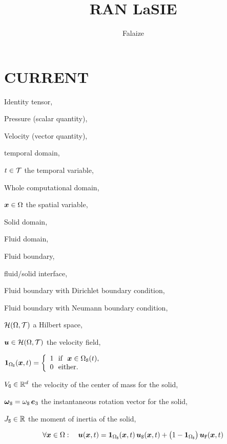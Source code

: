 \documentclass[10pt,a4paper]{article}
\author{Falaize}
\title{RAN LaSIE}
\begin{document}
%
%
\part{CURRENT}
\begin{description}
\item[$\Id$] Identity tensor,
%
\item[$p$] Pressure (scalar quantity),
%
\item[$\vu$] Velocity (vector quantity),
%
\item[$\sT\subset \RR$] temporal domain,
%
\item $t \in \mathcal T$ the temporal variable,
%
\item[$\dom\subset \RR ^d$] Whole computational domain,
%
\item $\boldsymbol{x} \in \Omega$ the spatial variable,
%
\item[$\doms(t) \subset \Omega$] Solid domain,
%
\item[$\domf(t) = \dom \setminus \doms(t)$] Fluid domain,
%
\item[$\bou(t)$] Fluid boundary,
%
\item[$\boui(t)\subset \bou$] fluid/solid interface,
%
\item[$\boud\subseteq \big(\bou\setminus \boui(t)\big)$] Fluid boundary with Dirichlet boundary condition,
%
\item[$\boun \subseteq \big(\bou \setminus \boui(t)\big)$] Fluid boundary with Neumann boundary condition,
%
\item $\mathcal H(\Omega, \mathcal T)$ a Hilbert space,
%
\item $\boldsymbol{u} \in \mathcal H(\Omega, \mathcal T)$ the velocity field,
%
\item $\boldsymbol 1_{\Omega_{\mathtt{S}}}(\boldsymbol{x}, t)=\left\{\begin{array}{l}
1 \mbox{~~if~~} \boldsymbol{x} \in \Omega_{\mathtt{S}}(t), \\
0 \mbox{~~either}.
\end{array} \right.$
%
\item $V_{\mathtt{G}}\in\mathbb{R}^d$ the velocity of the center of mass for the solid,
%
\item $\boldsymbol{\omega}_{{\mathtt{S}}} = \omega_{{\mathtt{S}}}\,\boldsymbol{e}_3 $ the instantaneous rotation vector for the solid,
%
\item $J_{\mathtt{S}} \in \mathbb{R}$ the moment of inertia of the solid,
%
%
\end{description}
%
$$\forall \boldsymbol{x} \in \Omega: \quad \boldsymbol{u}(\boldsymbol{x}, t) = \boldsymbol 1_{\Omega_{\mathtt{S}}}(\boldsymbol{x}, t)\, \boldsymbol{u}_{\mathtt{S}}(\boldsymbol{x}, t) + \big(1-\boldsymbol 1_{\Omega_{\mathtt{S}}} \big)\,\boldsymbol{u}_{\mathtt{F}}(\boldsymbol{x}, t)$$
%
\end{document}
